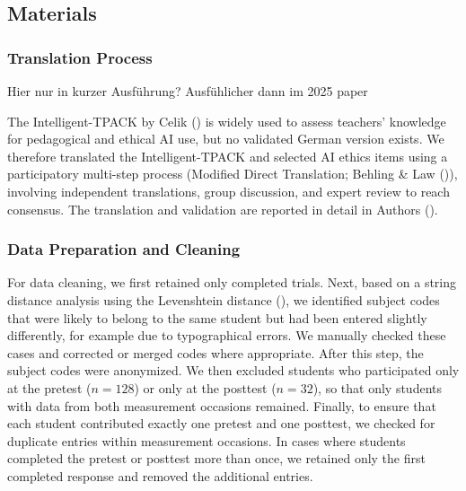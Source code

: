 \documentclass[
  letterpaper,
  DIV=11,
  numbers=noendperiod]{scrartcl}
\begin{document}
\subsection{Materials}\label{materials}

\subsubsection{Translation Process}\label{translation-process}

\begin{tcolorbox}[enhanced jigsaw, breakable, colback=white, opacitybacktitle=0.6, colbacktitle=quarto-callout-note-color!10!white, leftrule=.75mm, colframe=quarto-callout-note-color-frame, toprule=.15mm, opacityback=0, coltitle=black, bottomrule=.15mm, bottomtitle=1mm, toptitle=1mm, titlerule=0mm, title=\textcolor{quarto-callout-note-color}{\faInfo}\hspace{0.5em}{Note}, arc=.35mm, rightrule=.15mm, left=2mm]

Hier nur in kurzer Ausführung? Ausfühlicher dann im 2025 paper

\end{tcolorbox}

The Intelligent-TPACK by Celik () is
widely used to assess teachers' knowledge for pedagogical and ethical AI
use, but no validated German version exists. We therefore translated the
Intelligent-TPACK and selected AI ethics items using a participatory
multi-step process (Modified Direct Translation; Behling \& Law
()), involving independent
translations, group discussion, and expert review to reach consensus.
The translation and validation are reported in detail in Authors
().

\subsubsection{Data Preparation and
Cleaning}\label{data-preparation-and-cleaning}

For data cleaning, we first retained only completed trials. Next, based
on a string distance analysis using the Levenshtein distance
(), we identified
subject codes that were likely to belong to the same student but had
been entered slightly differently, for example due to typographical
errors. We manually checked these cases and corrected or merged codes
where appropriate. After this step, the subject codes were anonymized.
We then excluded students who participated only at the pretest
(\(n=128\)) or only at the posttest (\(n=32\)), so that only students
with data from both measurement occasions remained. Finally, to ensure
that each student contributed exactly one pretest and one posttest, we
checked for duplicate entries within measurement occasions. In cases
where students completed the pretest or posttest more than once, we
retained only the first completed response and removed the additional
entries.
\end{document}
